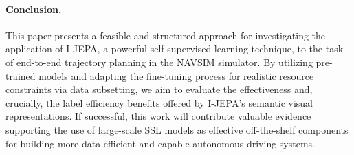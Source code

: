 \documentclass{article}
\begin{document}
\paragraph{Conclusion.}
This paper presents a feasible and structured approach for investigating the application of I-JEPA, a powerful self-supervised learning technique, to the task of end-to-end trajectory planning in the NAVSIM simulator. By utilizing pre-trained models and adapting the fine-tuning process for realistic resource constraints via data subsetting, we aim to evaluate the effectiveness and, crucially, the label efficiency benefits offered by I-JEPA's semantic visual representations. If successful, this work will contribute valuable evidence supporting the use of large-scale SSL models as effective off-the-shelf components for building more data-efficient and capable autonomous driving systems.


\newpage

\end{document}

